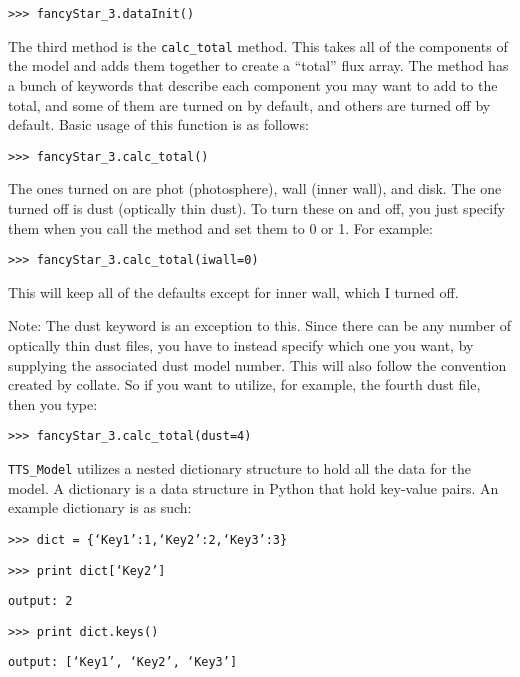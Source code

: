\documentclass{article}
\begin{document}
\vspace{2mm}
\texttt{>>> fancyStar\_3.dataInit()}
\vspace{2mm}

The third method is the \texttt{calc\_total} method. This takes all of the components of the model and adds them together to create a “total” flux array. The method has a bunch of keywords that describe each component you may want to add to the total, and some of them are turned on by default, and others are turned off by default. Basic usage of this function is as follows:

\vspace{2mm}
\texttt{>>> fancyStar\_3.calc\_total()}
\vspace{2mm}

\noindent The ones turned on are phot (photosphere), wall (inner wall), and disk. The one turned off is dust (optically thin dust). To turn these on and off, you just specify them when you call the method and set them to 0 or 1. For example: 

\vspace{2mm}
\texttt{>>> fancyStar\_3.calc\_total(iwall=0)}
\vspace{2mm}
 
This will keep all of the defaults except for inner wall, which I turned off. 
 
Note: The dust keyword is an exception to this. Since there can be any number of optically thin dust files, you have to instead specify which one you want, by supplying the associated dust model number. This will also follow the convention created by collate. So if you want to utilize, for example, the fourth dust file, then you type: 

\vspace{2mm}
\texttt{>>> fancyStar\_3.calc\_total(dust=4)}
\vspace{2mm}
 
\texttt{TTS\_Model} utilizes a nested dictionary structure to hold all the data for the model. A dictionary is a data structure in Python that hold key-value pairs. An example dictionary is as such: 
 
\vspace{2mm}
\texttt{>>> dict = \{‘Key1’:1,‘Key2’:2,‘Key3’:3\}}

\texttt{>>> print dict[‘Key2’]}

\texttt{output: 2 }

\texttt{>>> print dict.keys() }

\texttt{output: [‘Key1’, ‘Key2’, ‘Key3’] }
\vspace{2mm}
 
\end{document}
